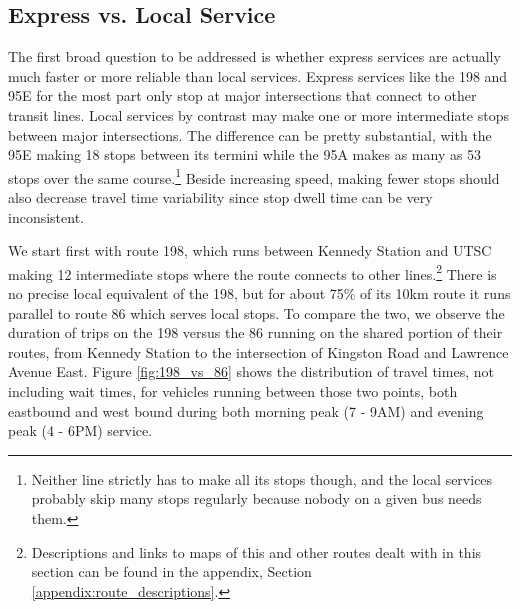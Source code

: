 \documentclass{article}
\begin{document}
	\subsection{Express vs. Local Service}\label{sec:exp_v_loc}
		The first broad question to be addressed is whether express services are actually much faster or more reliable than local services. Express services like the 198 and 95E for the most part only stop at major intersections that connect to other transit lines. Local services by contrast may make one or more intermediate stops between major intersections. The difference can be pretty substantial, with the 95E making 18 stops between its termini while the 95A makes as many as 53 stops over the same course.\footnote{
			Neither line strictly has to make all its stops though, and the local services probably skip many stops regularly because nobody on a given bus needs them.
		}
		Beside increasing speed, making fewer stops should also decrease travel time variability since stop dwell time can be very inconsistent.
		
		We start first with route 198, which runs between Kennedy Station and UTSC making 12 intermediate stops where the route connects to other lines.\footnote{
			Descriptions and links to maps of this and other routes dealt with in this section can be found in the appendix, Section \ref{appendix:route_descriptions}.
		} 
		There is no precise local equivalent of the 198, but for about 75\% of its 10km route it runs parallel to route 86 which serves local stops. To compare the two, we observe the duration of trips on the 198 versus the 86 running on the shared portion of their routes, from Kennedy Station to the intersection of Kingston Road and Lawrence Avenue East. Figure \ref{fig:198_vs_86} shows the distribution of travel times, not including wait times, for vehicles running between those two points, both eastbound and west bound during both morning peak (7 - 9AM) and evening peak (4 - 6PM) service. 
\end{document}
